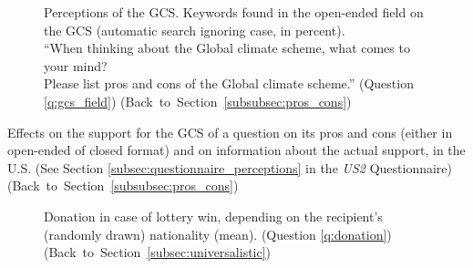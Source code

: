 \begin{figure}[h!]
    \caption[Topics of open-ended field on the GCS]{Perceptions of the GCS. Keywords found in the open-ended field on the GCS (automatic search ignoring case, in percent). \\ ``When thinking about the Global climate scheme, what comes to
    your mind?
    \\ Please list pros and cons of the Global climate scheme.'' (Question \ref{q:gcs_field}) \hfill (Back~to~Section~\ref{subsubsec:pros_cons})}\label{fig:gcs_field_contains}
\end{figure}

\begin{table}[h]
    \caption[Campaign and bandwagon effects on the support for the GCS.]{Effects on the support for the GCS of a question on its pros and cons (either in open-ended of closed format) and on information about the actual support, in the U.S. (See Section \ref{subsec:questionnaire_perceptions} in the \textit{US2} Questionnaire)  \hfill (Back~to~Section~\ref{subsubsec:pros_cons})} \label{tab:branch_gcs}
    \makebox[\textwidth][c]{
        
    }
    {\footnotesize %
    }
\end{table}

\begin{figure}[h!]
    \caption[Donation to Africa vs. own country]{Donation in case of lottery win, depending on the recipient's (randomly drawn) nationality (mean). (Question \ref{q:donation})\hfill (Back~to~Section~\ref{subsec:universalistic})}\label{fig:donation}
\end{figure}

